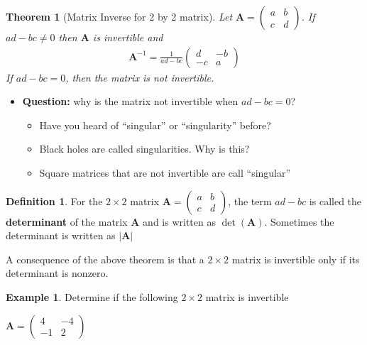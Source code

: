 \documentclass[
]{book}
\providecommand{\tightlist}{%
  \setlength{\itemsep}{0pt}\setlength{\parskip}{0pt}}
\newtheorem{theorem}{Theorem}[chapter]
\theoremstyle{definition}
\newtheorem{definition}{Definition}[chapter]
\theoremstyle{definition}
\newtheorem{example}{Example}[chapter]
\theoremstyle{definition}
\theoremstyle{definition}
\theoremstyle{remark}
\begin{document}
\begin{theorem}[Matrix Inverse for 2 by 2 matrix]
\protect\hypertarget{thm:matrix-2by2}{}\label{thm:matrix-2by2}Let \(\mathbf{A} = \begin{pmatrix} a & b \\ c & d \end{pmatrix}\). If \(ad - bc \neq 0\) then \(\mathbf{A}\) is invertible and
\[
\begin{aligned}
\mathbf{A}^{-1} = \frac{1}{ad - bc} \begin{pmatrix} d & -b \\ -c & a \end{pmatrix}
\end{aligned}
\]
If \(ad - bc = 0\), then the matrix is not invertible.
\end{theorem}

\begin{itemize}
\tightlist
\item
  \textbf{Question:} why is the matrix not invertible when \(ad - bc = 0\)?

  \begin{itemize}
  \tightlist
  \item
    Have you heard of ``singular'' or ``singularity'' before?
  \item
    Black holes are called singularities. Why is this?
  \item
    Square matrices that are not invertible are call ``singular''
  \end{itemize}
\end{itemize}

\begin{definition}
For the \(2 \times 2\) matrix \(\mathbf{A} = \begin{pmatrix} a & b \\ c & d \end{pmatrix}\), the term \(ad - bc\) is called the \textbf{determinant} of the matrix \(\mathbf{A}\) and is written as \(\operatorname{det}(\mathbf{A})\). Sometimes the determinant is written as \(| \mathbf{A}|\)
\end{definition}

A consequence of the above theorem is that a \(2 \times 2\) matrix is invertible only if its determinant is nonzero.

\begin{example}
Determine if the following \(2 \times 2\) matrix is invertible

\(\mathbf{A} = \begin{pmatrix} 4 & -4 \\ -1 & 2 \end{pmatrix}\)
\end{example}
\end{document}
